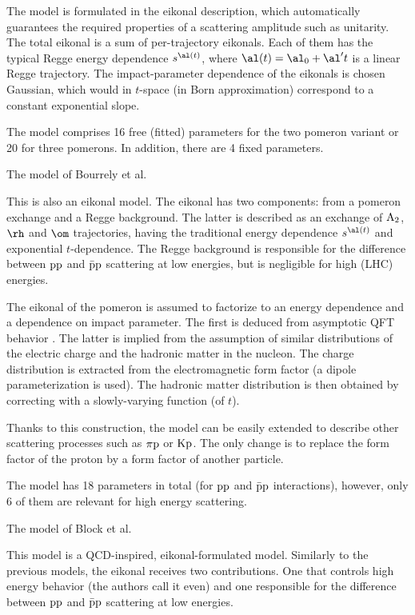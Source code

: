 The model is formulated in the eikonal description, which automatically guarantees the required properties of a scattering amplitude such as unitarity. The total eikonal is a sum of per-trajectory eikonals. Each of them has the typical Regge energy dependence $s^{\al(t)}$, where $\al(t) = \al_0 + \al' t$ is a linear Regge trajectory. The impact-parameter dependence of the eikonals is chosen Gaussian, which would in $t$-space (in Born approximation) correspond to a constant exponential slope.

The model comprises 16 free (fitted) parameters for the two pomeron variant or 20 for three pomerons. In addition, there are 4 fixed parameters.

\caption{The model of Bourrely et al. }

This is also an eikonal model. The eikonal has two components: from a pomeron exchange and a Regge background. The latter is described as an exchange of $\rm A_2$, $\rm \rh$ and $\rm \om$ trajectories, having the traditional energy dependence $s^{\al(t)}$ and exponential $t$-dependence. The Regge background is responsible for the difference between $\rm pp$ and $\rm\bar pp$ scattering at low energies, but is negligible for high (LHC) energies.

The eikonal of the pomeron is assumed to factorize to an energy dependence and a dependence on impact parameter. The first is deduced from asymptotic QFT behavior . The latter is implied from the assumption of similar distributions of the electric charge and the hadronic matter in the nucleon. The charge distribution is extracted from the electromagnetic form factor (a dipole parameterization is used). The hadronic matter distribution is then obtained by correcting with a slowly-varying function (of $t$).

Thanks to this construction, the model can be easily extended to describe other scattering processes such as $\rm \pi p$ or $\rm Kp$. The only change is to replace the form factor of the proton by a form factor of another particle.

The model has 18 parameters in total (for $\rm pp$ and $\rm \bar p p$ interactions), however, only 6 of them are relevant for high energy scattering.

\caption{The model of Block et al. }

This model is a QCD-inspired, eikonal-formulated model. Similarly to the previous models, the eikonal receives two contributions. One that controls high energy behavior (the authors call it even) and one responsible for the difference between $\rm pp$ and $\rm\bar pp$ scattering at low energies.

